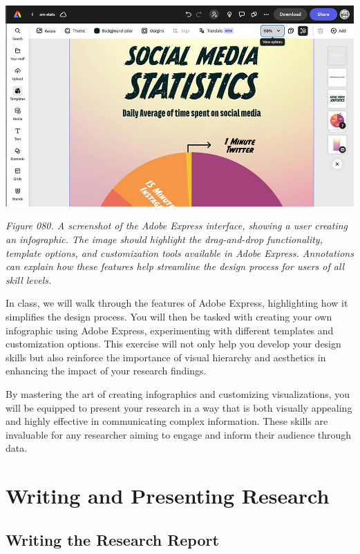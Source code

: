 \documentclass[
]{book}
\begin{document}
\includegraphics[width=1\textwidth,height=\textheight]{images/fig080.jpg}

\emph{Figure 080. A screenshot of the Adobe Express interface, showing a user creating an infographic. The image should highlight the drag-and-drop functionality, template options, and customization tools available in Adobe Express. Annotations can explain how these features help streamline the design process for users of all skill levels.}

In class, we will walk through the features of Adobe Express, highlighting how it simplifies the design process. You will then be tasked with creating your own infographic using Adobe Express, experimenting with different templates and customization options. This exercise will not only help you develop your design skills but also reinforce the importance of visual hierarchy and aesthetics in enhancing the impact of your research findings.

By mastering the art of creating infographics and customizing visualizations, you will be equipped to present your research in a way that is both visually appealing and highly effective in communicating complex information. These skills are invaluable for any researcher aiming to engage and inform their audience through data.

\chapter{Writing and Presenting Research}\label{writing-and-presenting-research}

\section{Writing the Research Report}\label{writing-the-research-report}
\end{document}
